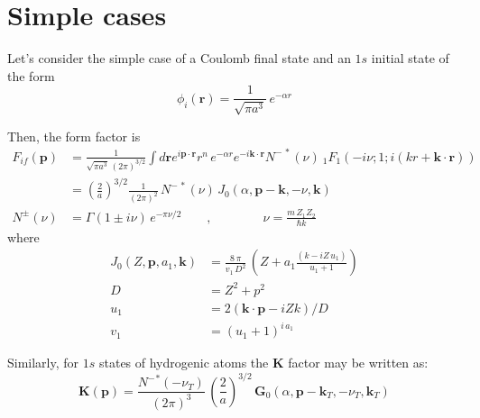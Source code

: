 \section{Simple cases}
\label{S:simple-cases}

Let's consider the simple case of a Coulomb final state and an $1s$ initial state of the form 
\begin{equation*}
  \phi_{i}(\bm{r})= \frac{1}{\sqrt{\pi a^{3}}}\, e^{-\alpha r} 
\end{equation*}

Then, the form factor is 
\begin{subequations}
  \begin{align}
    \label{Q:Fif-hyd}
    F_{if}(\bm{p})&= \frac{1}{\sqrt{\pi a^{3}} \, (2\pi)^{3/2}} \int d\bm{r} e^{i \bm{p}\cdot \bm{r}} r^{n}\, e^{-\alpha r}  e^{-i \bm{k}\cdot \bm{r}} N^{-\,*}(\nu)~ _{1}F_{1}\left(-i\nu; 1; i (k r + \bm{k}\cdot\bm{r}) \right)\\
    &= \left(\frac{2}{a}\right)^{3/2} \frac{1}{(2 \pi)^{2}}\, N^{-\,*}(\nu) \, J_{0}(\alpha, \bm{p}-\bm{k}, -\nu, \bm{k}) \\
  N^{\pm}(\nu)&=\Gamma(1 \pm i \nu)\, e^{-\pi \nu/2} \qquad , \qquad \qquad  \nu= \frac{m\, Z_{1}Z_{2}}{\hbar k}
  \end{align}
\end{subequations}
where
\begin{align*}
  J_{0}(Z, \bm{p}, a_{1}, \bm{k})&= \frac{8\,\pi}{v_{1}\, D^{2} }\,\left(Z + a_{1}\frac{\left(k - i {Z\,u_{1} }\right) }{u_{1} +1}\right)\\
D&= Z^{2}+ p^{2}\\
u_{1} &= 2 \left( \bm{k} \cdot \bm{p} - i Z k \right)/D \\
v_{1}&= \left( u_{1}+1\right) ^{i\,a_{1}}
\end{align*}

Similarly, for $1s$ states of hydrogenic atoms the $\bm{K}$ factor may be written as:
\begin{equation}
  \label{Q:G-K-relation-1s}
  \bm{K}(\bm{p}) = \frac{{N^{-}}^{*}(-\nu_{T})}{(2 \pi)^{3}}\,\left(\frac{2}{a}\right)^{3/2}\, \bm{G}_{0}(\alpha, \bm{p}-\bm{k}_{T}, - \nu_{T}, \bm{k}_{T})
\end{equation}

